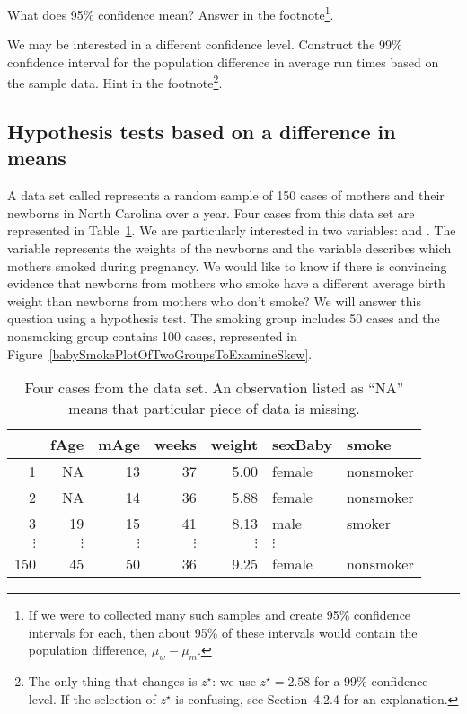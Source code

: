 \begin{exercise}
What does 95\% confidence mean? Answer in the footnote\footnote{If we were to collected many such samples and create 95\% confidence intervals for each, then about 95\% of these intervals would contain the population difference, $\mu_w - \mu_m$.}.
\end{exercise}

\begin{exercise}
We may be interested in a different confidence level. Construct the 99\% confidence interval for the population difference in average run times based on the sample data. Hint in the footnote\footnote{The only thing that changes is $z^{\star}$: we use $z^{\star}=2.58$ for a 99\% confidence level. If the selection of $z^{\star}$ is confusing, see Section~4.2.4 for an explanation.}.
\end{exercise}

\subsection{Hypothesis tests based on a difference in means}

A data set called  represents a random sample of 150 cases of mothers and their newborns in North Carolina over a year. Four cases from this data set are represented in Table~\ref{babySmokeDF}. We are particularly interested in two variables:  and . The  variable represents the weights of the newborns and the  variable describes which mothers smoked during pregnancy. We would like to know if there is convincing evidence that newborns from mothers who smoke have a different average birth weight than newborns from mothers who don't smoke? We will answer this question using a hypothesis test. The smoking group includes 50 cases and the nonsmoking group contains 100 cases, represented in Figure~\ref{babySmokePlotOfTwoGroupsToExamineSkew}.
\begin{table}[h]
\centering
\begin{tabular}{rrrrrll}
  \hline
 & fAge & mAge & weeks & weight & sexBaby & smoke \\ 
  \hline
1 & NA & 13 &  37 & 5.00 & female & nonsmoker \\ 
  2 & NA & 14 &  36 & 5.88 & female & nonsmoker \\ 
  3 & 19 & 15 &  41 & 8.13 & male & smoker \\ 
  $\vdots$ &   $\vdots$ &   $\vdots$ &   $\vdots$ &   $\vdots$ &   $\vdots$ \\
  150 & 45 & 50 &  36 & 9.25 & female & nonsmoker \\ 
   \hline
\end{tabular}
\caption{Four cases from the  data set. An observation listed as ``NA'' means that particular piece of data is missing.}
\label{babySmokeDF}
\end{table}

